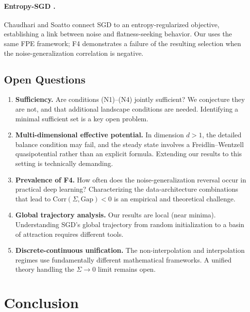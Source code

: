 \documentclass[11pt,a4paper]{article}
\begin{document}
\paragraph{Entropy-SGD \citep{chaudhari2018stochastic}.}
Chaudhari and Soatto connect SGD to an entropy-regularized objective,
establishing a link between noise and flatness-seeking behavior.  Our
 uses the same FPE framework; F4 demonstrates a failure
of the resulting selection when the noise-generalization correlation is
negative.

\subsection{Open Questions}
\label{sec:open}

\begin{enumerate}[nosep]
  \item \textbf{Sufficiency.}  Are conditions (N1)--(N4) jointly sufficient?
        We conjecture they are not, and that additional landscape conditions
        are needed.  Identifying a minimal sufficient set is a key open problem.
  \item \textbf{Multi-dimensional effective potential.}  In dimension $d>1$,
        the detailed balance condition may fail, and the steady state involves
        a Freidlin--Wentzell quasipotential rather than an explicit formula.
        Extending our results to this setting is technically demanding.
  \item \textbf{Prevalence of F4.}  How often does the noise-generalization
        reversal occur in practical deep learning?  Characterizing the
        data-architecture combinations that lead to $\mathrm{Corr}(\Sigma,
        \mathrm{Gap}) < 0$ is an empirical and theoretical challenge.
  \item \textbf{Global trajectory analysis.}  Our results are local (near
        minima).  Understanding SGD's global trajectory from random
        initialization to a basin of attraction requires different tools.
  \item \textbf{Discrete-continuous unification.}  The non-interpolation and
        interpolation regimes use fundamentally different mathematical
        frameworks.  A unified theory handling the $\Sigma\to 0$ limit
        remains open.
\end{enumerate}

\section{Conclusion}
\label{sec:conclusion}
\end{document}
